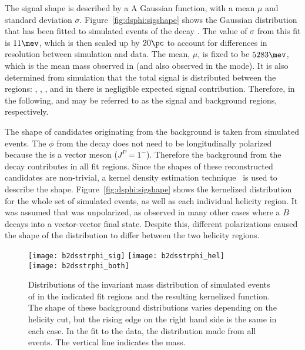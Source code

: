 The signal shape is described by a A Gaussian function, with a mean $\mu$ and standard deviation
$\sigma$.
Figure~\ref{fig:dsphi:sigshape} shows the Gaussian distribution that has been fitted to simulated
events of the decay \btodsphi.
The value of $\sigma$ from this fit is $11\mev$, which is then scaled up by $20\pc$ to account for
differences in resolution between simulation and data.
The mean, $\mu$, is fixed to be $5283\mev$, which is the mean mass observed in
\decay{\Bp}{\Dz\pip} (and also observed in the \Bs mode).
It is also determined from simulation that the total signal is distributed between the regions:
\pc, \pc, \pc, and in \rD there is negligible expected signal contribution.
Therefore, in the following, \rA and \rD may be referred to as the signal and background regions,
respectively.

The shape of \Bp candidates originating from the \btodsstrphi background is taken from simulated
events.
The $\phi$ from the decay \btodsstrphi does not need to be longitudinally polarized because the
\Dssp is a vector meson ($J^P=1^-$).
Therefore the background from the decay \btodsstrphi contributes in all fit regions.
Since the shapes of these reconstructed candidates are non-trivial, a kernel density estimation
technique~\cite{Cranmer:2000du} is used to describe the shape.
Figure~\ref{fig:dsphi:sigshape} shows the kernelized distribution for the whole set of simulated
events, as well as each individual helicity region.
It was assumed that \Dssp was unpolarized, as observed in many other cases where a
$B$ decays into a vector-vector final state.
Despite this, different \phii polarizations caused the shape of the distribution to differ
between the two helicity regions.

\begin{figure}
  \begin{center}
    \texttt{[image: b2dsstrphi\_sig]}
    \texttt{[image: b2dsstrphi\_hel]}\\
    \texttt{[image: b2dsstrphi\_both]}
    \caption[Shape contributions from \btodsstrphi]
    {
      Distributions of the invariant mass distribution of simulated events of \btodsstrphi
      in the indicated fit regions and the resulting kernelized function.
      The shape of these background distributions varies depending on the helicity cut, but the
      rising edge on the right hand side is the same in each case.
      In the fit to the data, the distribution made from all events.
      The vertical line indicates the \Bp mass.
    }
    \label{fig:dsphi:dsstrphi}
  \end{center}
\end{figure}

